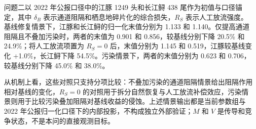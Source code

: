 问题二以 2022 年公报口径中的江豚 1249 头和长江鲟 438 尾作为初值与口径锚定，其中 \(\delta_B\) 表示通道阻隔和栖息地碎片化的综合损失，\(R_S\) 表示人工放流强度。基线修复情景下，江豚和长江鲟的归一化末值分别为 1.133 和 1.140。仅提高通道阻隔且不叠加污染时，两者的末值为 0.901 和 0.856，较基线分别下降 20.5\% 和 24.9\%；将人工放流项置为 \(R_S=0\) 后，末值分别为 1.145 和 0.519，江豚较基线变化 +1.0\%，长江鲟下降 54.5\%。污染情景下，两者的末值分别为 0.623 和 0.706，较基线分别下降 45.0\% 和 38.0\%。

从机制上看，这些对照只支持分项比较：不叠加污染的通道阻隔情景给出阻隔作用相对基线的变化，\(R_S=0\) 的对照用于拆分自然恢复与人工放流补偿效应，污染情景则用于比较污染叠加阻隔对基线收益的侵蚀。上述情景输出都是当前参数组与 2022 年公报归一化口径下的内部投影，不构成独立外部验证；\(M\) 和 \(V\) 是传导和竞争状态，不是本问的直接观测目标。
